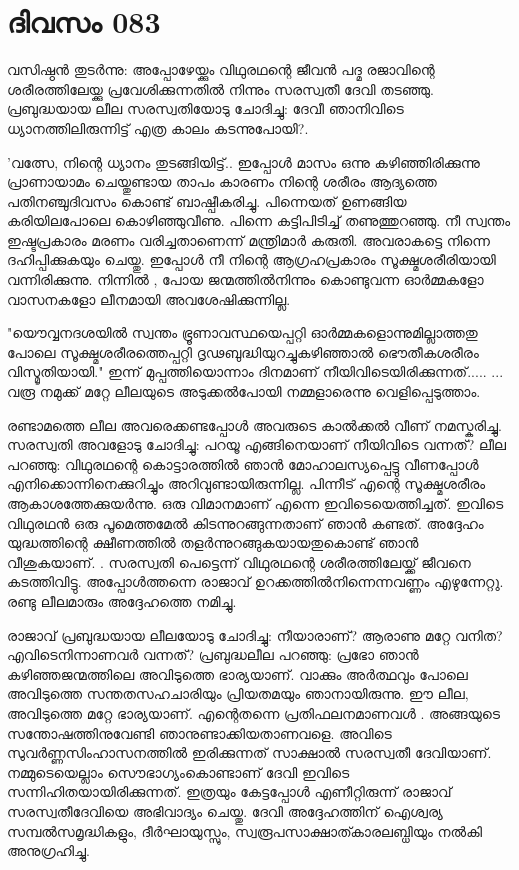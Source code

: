 \newpage
\section{ദിവസം 083}


വസിഷ്ഠന്‍ തുടര്‍ന്നു: അപ്പോഴേയ്ക്കും വിഥുരഥന്റെ ജീവന്‍ പദ്മ രജാവിന്റെ ശരീരത്തിലേയ്ക്കു പ്രവേശിക്കുന്നതില്‍ നിന്നും സരസ്വതീ ദേവി തടഞ്ഞു. പ്രബുദ്ധയായ ലീല സരസ്വതിയോടു ചോദിച്ചു: ദേവീ ഞാനിവിടെ ധ്യാനത്തിലിരുന്നിട്ട്‌ എത്ര കാലം കടന്നുപോയി?.

'വത്സേ, നിന്റെ ധ്യാനം തുടങ്ങിയിട്ട്‌.. ഇപ്പോള്‍ മാസം ഒന്നു കഴിഞ്ഞിരിക്കുന്നു  പ്രാണായാമം ചെയ്തുണ്ടായ താപം കാരണം നിന്റെ ശരീരം ആദ്യത്തെ പതിനഞ്ചുദിവസം കൊണ്ട്‌ ബാഷ്പീകരിച്ചു. പിന്നെയത്‌ ഉണങ്ങിയ കരിയിലപോലെ കൊഴിഞ്ഞുവീണു. പിന്നെ കട്ടിപിടിച്ച്‌ തണുത്തുറഞ്ഞു. നീ സ്വന്തം ഇഷ്ടപ്രകാരം മരണം വരിച്ചതാണെന്ന് മന്ത്രിമാര്‍ കരുതി. അവരാകട്ടെ നിന്നെ ദഹിപ്പിക്കുകയും ചെയ്തു. ഇപ്പോള്‍ നീ നിന്റെ ആഗ്രഹപ്രകാരം സൂക്ഷ്മശരീരിയായി വന്നിരിക്കുന്നു. നിന്നില്‍ , പോയ ജന്മത്തില്‍നിന്നും കൊണ്ടുവന്ന ഓര്‍മ്മകളോ വാസനകളോ ലീനമായി അവശേഷിക്കുന്നില്ല.

"യൌവ്വനദശയില്‍ സ്വന്തം ഭ്രൂണാവസ്ഥയെപ്പറ്റി ഓര്‍മ്മകളൊന്നുമില്ലാത്തതു പോലെ സൂക്ഷ്മശരീരത്തെപ്പറ്റി ദൃഢബുദ്ധിയുറച്ചുകഴിഞ്ഞാല്‍ ഭൌതീകശരീരം വിസ്മൃതിയായി." ഇന്ന് മുപ്പത്തിയൊന്നാം ദിനമാണ്‌ നീയിവിടെയിരിക്കുന്നത്‌.....  ... വരൂ നമുക്ക്‌ മറ്റേ ലീലയുടെ അടുക്കല്‍പോയി നമ്മളാരെന്നു വെളിപ്പെടുത്താം. 

രണ്ടാമത്തെ ലീല അവരെക്കണ്ടപ്പോള്‍ അവരുടെ കാല്‍ക്കല്‍ വീണ്‌ നമസ്കരിച്ചു. സരസ്വതി അവളോടു ചോദിച്ചു: പറയൂ എങ്ങിനെയാണ്‌ നീയിവിടെ വന്നത്‌? ലീല പറഞ്ഞു: വിഥുരഥന്റെ കൊട്ടാരത്തില്‍ ഞാന്‍ മോഹാലസ്യപ്പെട്ടു വീണപ്പോള്‍ എനിക്കൊന്നിനെക്കുറിച്ചും അറിവുണ്ടായിരുന്നില്ല. പിന്നീട്‌ എന്റെ സൂക്ഷ്മശരീരം ആകാശത്തേക്കുയര്‍ന്നു. ഒരു വിമാനമാണ്‌ എന്നെ ഇവിടെയെത്തിച്ചത്‌. ഇവിടെ വിഥുരഥന്‍ ഒരു പൂമെത്തമേല്‍ കിടന്നുറങ്ങുന്നതാണ്‌ ഞാന്‍ കണ്ടത്‌. അദ്ദേഹം യുദ്ധത്തിന്റെ ക്ഷീണത്തില്‍ തളര്‍ന്നുറങ്ങുകയായതുകൊണ്ട്‌ ഞാന്‍ വീശുകയാണ്‌. . സരസ്വതി പെട്ടെന്ന് വിഥുരഥന്റെ ശരീരത്തിലേയ്ക്ക്‌ ജീവനെ കടത്തിവിട്ടു. അപ്പോള്‍ത്തന്നെ രാജാവ്‌ ഉറക്കത്തില്‍നിന്നെന്നവണ്ണം എഴുന്നേറ്റു. രണ്ടു ലീലമാരും അദ്ദേഹത്തെ നമിച്ചു.

രാജാവ്‌ പ്രബുദ്ധയായ ലീലയോടു ചോദിച്ചു: നീയാരാണ്‌? ആരാണു മറ്റേ വനിത?എവിടെനിന്നാണവര്‍ വന്നത്‌? പ്രബുദ്ധലീല പറഞ്ഞു: പ്രഭോ ഞാന്‍ കഴിഞ്ഞജന്മത്തിലെ അവിടുത്തെ ഭാര്യയാണ്‌. വാക്കും അര്‍ത്ഥവും പോലെ അവിടുത്തെ സന്തതസഹചാരിയും പ്രിയതമയും ഞാനായിരുന്നു. ഈ ലീല, അവിടുത്തെ മറ്റേ ഭാര്യയാണ്‌. എന്റെതന്നെ പ്രതിഫലനമാണവള്‍ .  അങ്ങയുടെ സന്തോഷത്തിനുവേണ്ടി ഞാനുണ്ടാക്കിയതാണവളെ. അവിടെ സുവര്‍ണ്ണസിംഹാസനത്തില്‍ ഇരിക്കുന്നത്‌ സാക്ഷാല്‍ സരസ്വതീ ദേവിയാണ്‌. നമ്മുടെയെല്ലാം സൌഭാഗ്യംകൊണ്ടാണ്‌ ദേവി ഇവിടെ സന്നിഹിതയായിരിക്കുന്നത്‌. ഇത്രയും കേട്ടപ്പോള്‍ എണീറ്റിരുന്ന് രാജാവ്‌ സരസ്വതീദേവിയെ അഭിവാദ്യം ചെയ്തു. ദേവി അദ്ദേഹത്തിന്‌ ഐശ്വര്യ സമ്പല്‍സമൃദ്ധികളും, ദീര്‍ഘായുസ്സും, സ്വരൂപസാക്ഷാത്കാരലബ്ധിയും നല്‍കി അനുഗ്രഹിച്ചു.

